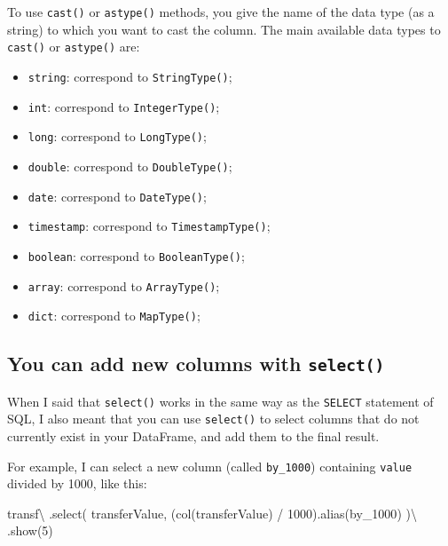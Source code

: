 \documentclass[
  11pt,
  letterpaper,
  DIV=11,
  numbers=noendperiod]{scrreprt}
\newenvironment{Shaded}{\begin{snugshade}}{\end{snugshade}}
\newcommand{\DecValTok}[1]{\textcolor[rgb]{0.68,0.00,0.00}{#1}}
\newcommand{\NormalTok}[1]{\textcolor[rgb]{0.00,0.23,0.31}{#1}}
\newcommand{\OperatorTok}[1]{\textcolor[rgb]{0.37,0.37,0.37}{#1}}
\newcommand{\StringTok}[1]{\textcolor[rgb]{0.13,0.47,0.30}{#1}}
\providecommand{\tightlist}{%
  \setlength{\itemsep}{0pt}\setlength{\parskip}{0pt}}\usepackage{longtable,booktabs,array}
\begin{document}
To use \texttt{cast()} or \texttt{astype()} methods, you give the name
of the data type (as a string) to which you want to cast the column. The
main available data types to \texttt{cast()} or \texttt{astype()} are:

\begin{itemize}
\tightlist
\item
  \texttt{\textquotesingle{}string\textquotesingle{}}: correspond to
  \texttt{StringType()};
\item
  \texttt{\textquotesingle{}int\textquotesingle{}}: correspond to
  \texttt{IntegerType()};
\item
  \texttt{\textquotesingle{}long\textquotesingle{}}: correspond to
  \texttt{LongType()};
\item
  \texttt{\textquotesingle{}double\textquotesingle{}}: correspond to
  \texttt{DoubleType()};
\item
  \texttt{\textquotesingle{}date\textquotesingle{}}: correspond to
  \texttt{DateType()};
\item
  \texttt{\textquotesingle{}timestamp\textquotesingle{}}: correspond to
  \texttt{TimestampType()};
\item
  \texttt{\textquotesingle{}boolean\textquotesingle{}}: correspond to
  \texttt{BooleanType()};
\item
  \texttt{\textquotesingle{}array\textquotesingle{}}: correspond to
  \texttt{ArrayType()};
\item
  \texttt{\textquotesingle{}dict\textquotesingle{}}: correspond to
  \texttt{MapType()};
\end{itemize}

\hypertarget{you-can-add-new-columns-with-select}{%
\subsection{\texorpdfstring{You can add new columns with
\texttt{select()}}{You can add new columns with select()}}\label{you-can-add-new-columns-with-select}}

When I said that \texttt{select()} works in the same way as the
\texttt{SELECT} statement of SQL, I also meant that you can use
\texttt{select()} to select columns that do not currently exist in your
DataFrame, and add them to the final result.

For example, I can select a new column (called \texttt{by\_1000})
containing \texttt{value} divided by 1000, like this:

\begin{Shaded}
\begin{Highlighting}[]
\NormalTok{transf}\OperatorTok{\textbackslash{}}
\NormalTok{  .select(}
    \StringTok{\textquotesingle{}transferValue\textquotesingle{}}\NormalTok{,}
\NormalTok{    (col(}\StringTok{\textquotesingle{}transferValue\textquotesingle{}}\NormalTok{) }\OperatorTok{/} \DecValTok{1000}\NormalTok{).alias(}\StringTok{\textquotesingle{}by\_1000\textquotesingle{}}\NormalTok{)}
\NormalTok{  )}\OperatorTok{\textbackslash{}}
\NormalTok{  .show(}\DecValTok{5}\NormalTok{)}
\end{Highlighting}
\end{Shaded}
\end{document}
